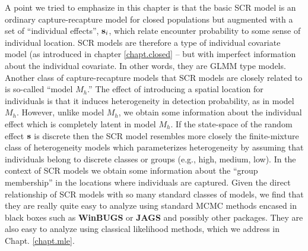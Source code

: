 {A point we tried to emphasize in this chapter is that the basic SCR
model is an ordinary capture-recapture model for
closed populations but augmented with a set
of ``individual effects'', ${\bf s}_{i}$, which relate encounter
probability to some sense of individual location. SCR models are
therefore a type of individual covariate model (as introduced in
chapter \ref{chapt.closed} -- but with imperfect information about the
individual covariate. In other words, they are GLMM type models.
 Another class of capture-recapture models
that SCR models are closely related to is so-called ``model $M_{h}$.''
The effect of introducing a spatial location for individuals is that
it induces heterogeneity in detection probability, as in model
$M_{h}$. However, unlike model $M_{h}$, we obtain some information
about the individual effect which is completely latent in model
$M_{h}$. If the state-space of the random effect ${\bf s}$ is discrete
then the SCR model resembles more closely the finite-mixture class of
heterogeneity models \citep{norris_pollock:1996} which parameterizes
heterogeneity by assuming that individuals belong to discrete classes
or groups (e.g., high, medium, low). In the context of SCR models we
obtain some information about the ``group membership'' in the
locations where individuals are captured.  Given the direct
relationship of SCR models with so many standard classes of models, we
find that they are really quite easy to analyze using standard MCMC
methods encased in black boxes such as {\bf WinBUGS} or {\bf JAGS} and
possibly other packages. They are also easy to analyze using classical
likelihood methods, which we address in Chapt. \ref{chapt.mle}.

}
